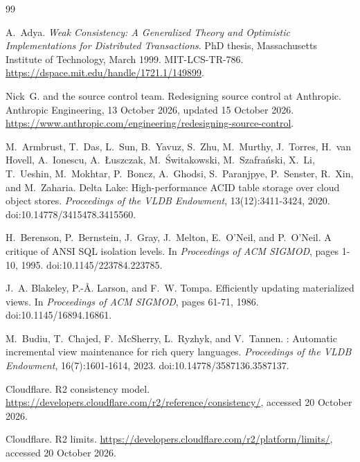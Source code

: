 \documentclass[11pt,letterpaper]{article}
\theoremstyle{definition}
\theoremstyle{remark}
\begin{document}
\begin{thebibliography}{99}
\small

A.~Adya.
\newblock \emph{Weak Consistency: A Generalized Theory and Optimistic Implementations for Distributed Transactions}.
\newblock PhD thesis, Massachusetts Institute of Technology, March 1999. MIT-LCS-TR-786.
\newblock \url{https://dspace.mit.edu/handle/1721.1/149899}.

Nick~G. and the source control team.
\newblock Redesigning source control at {Anthropic}.
\newblock Anthropic Engineering, 13 October 2026, updated 15 October 2026.
\newblock \url{https://www.anthropic.com/engineering/redesigning-source-control}.

M.~Armbrust, T.~Das, L.~Sun, B.~Yavuz, S.~Zhu, M.~Murthy, J.~Torres, H.~van Hovell, A.~Ionescu, A.~{\L}uszczak, M.~{\'S}witakowski, M.~Szafra{\'n}ski, X.~Li, T.~Ueshin, M.~Mokhtar, P.~Boncz, A.~Ghodsi, S.~Paranjpye, P.~Senster, R.~Xin, and M.~Zaharia.
\newblock Delta {Lake}: High-performance {ACID} table storage over cloud object stores.
\newblock \emph{Proceedings of the VLDB Endowment}, 13(12):3411-3424, 2020.
\newblock doi:10.14778/3415478.3415560.

H.~Berenson, P.~Bernstein, J.~Gray, J.~Melton, E.~O'Neil, and P.~O'Neil.
\newblock A critique of {ANSI} {SQL} isolation levels.
\newblock In \emph{Proceedings of ACM SIGMOD}, pages 1-10, 1995.
\newblock doi:10.1145/223784.223785.

J.~A. Blakeley, P.-{\AA}. Larson, and F.~W. Tompa.
\newblock Efficiently updating materialized views.
\newblock In \emph{Proceedings of ACM SIGMOD}, pages 61-71, 1986.
\newblock doi:10.1145/16894.16861.

M.~Budiu, T.~Chajed, F.~McSherry, L.~Ryzhyk, and V.~Tannen.
: Automatic incremental view maintenance for rich query languages.
\newblock \emph{Proceedings of the VLDB Endowment}, 16(7):1601-1614, 2023.
\newblock doi:10.14778/3587136.3587137.

Cloudflare.
\newblock R2 consistency model.
\newblock \url{https://developers.cloudflare.com/r2/reference/consistency/}, accessed 20 October 2026.

Cloudflare.
\newblock R2 limits.
\newblock \url{https://developers.cloudflare.com/r2/platform/limits/}, accessed 20 October 2026.


\end{thebibliography}
\end{document}
